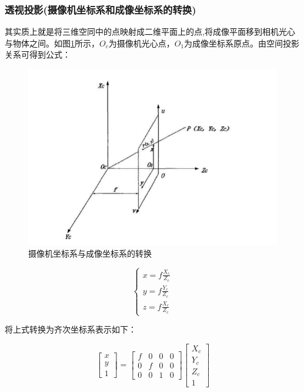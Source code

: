 \subsubsection{透视投影(摄像机坐标系和成像坐标系的转换)}

其实质上就是将三维空同中的点映射成二维平面上的点,将成像平面移到相机光心与物体之间。如图\ref{para_2}所示，$O_c$为摄像机光心点，$O_1$为成像坐标系原点。由空间投影关系可得到公式：

\begin{figure}[h]
	\includegraphics{pic/para_2.png}
	\caption{摄像机坐标系与成像坐标系的转换}
	\label{para_2}
\end{figure}

\begin{equation}
\left\{ {\begin{array}{*{20}{c}}
{x = f\frac{{{X_c}}}{{{Z_c}}}}\\
{y = f\frac{{{Y_c}}}{{{Z_c}}}}\\
{z = f\frac{{{X_c}}}{{{Z_c}}}}
\end{array}} \right.
\end{equation}

将上式转换为齐次坐标系表示如下：

\begin{equation}
\left[ {\begin{array}{*{20}{c}}
x\\
y\\
1
\end{array}} \right] = \left[ {\begin{array}{*{20}{c}}
f&0&0&0\\
0&f&0&0\\
0&0&1&0
\end{array}} \right]\left[ {\begin{array}{*{20}{c}}
{{X_c}}\\
{{Y_c}}\\
{{Z_c}}\\
1
\end{array}} \right]
\end{equation}

